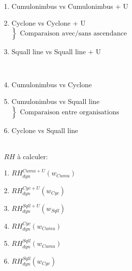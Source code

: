 \documentclass{article}
\begin{document}
\begin{list}{}{}
    \item 1. Cumulonimbus vs Cumulonimbus + U 
    \item 2. Cyclone vs Cyclone + U ~~~~~~~~~~~~~~~~~~~~~~~~~~~~~~~~~~~\hbox{
        $\left.\begin{array}{lcl}
            ~ \\
            ~\\
            ~ \\
          \end{array}\right\}\begin{array}{lcl}
           \text{Comparaison avec/sans ascendance}
         \end{array}$}
    \item 3. Squall line vs Squall line + U
    \item ~\\
    \item 4. Cumulonimbus vs Cyclone
    \item 5. Cumulonimbus vs Squall line     ~~~~~~~~~~~~~~~~~~~~~~~~~~~~~~\hbox{
        $\left.\begin{array}{lcl}
            ~ \\
            ~\\
            ~ \\
          \end{array}\right\}\begin{array}{lcl}
           \text{Comparaison entre organisations}
         \end{array}$}
    \item 6. Cyclone vs Squall line
\end{list}
~\\
$RH$ à calculer:
\begin{list}{}{}
    \item 1. $RH_{dyn}^{Cumu+U}(w_{Cumu})$
    \item 2. $RH_{dyn}^{Cyc+U}(w_{Cyc})$
    \item 3. $RH_{dyn}^{Sqll+U}(w_{Sqll})$
    \item 4. $RH_{dyn}^{Cyc}(w_{Cumu})$
    \item 5. $RH_{dyn}^{Sqll}(w_{Cumu})$
    \item 6. $RH_{dyn}^{Sqll}(w_{Cyc})$
\end{list}
\end{document}
